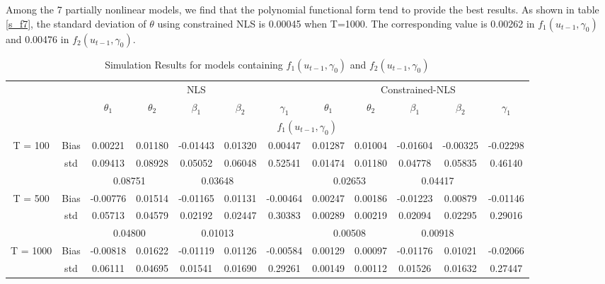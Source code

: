 \documentclass[a4paper,12pt,times,numbered,print,index]{report}
\numberwithin{equation}{section}
\begin{document}
Among the 7 partially nonlinear models, we find that the polynomial functional form tend to provide the best results. As shown in table \ref{s_f7}, the standard deviation of $\theta$ using constrained NLS is 0.00045 when T=1000. The corresponding value is 0.00262 in $f_1(u_{t-1}, \gamma_0)$ and 0.00476 in $f_2(u_{t-1}, \gamma_0)$.


\begin{table}[htbp]
  \centering
  \caption{Simulation Results for models containing $f_1 (u_{t-1}, \gamma_0)$ and $f_2 (u_{t-1}, \gamma_0)$}
    \begin{adjustbox}{max width=\textwidth}
    \begin{tabular}{cccccccccccc}
    \toprule
          &       & \multicolumn{5}{c}{NLS}               & \multicolumn{5}{c}{Constrained-NLS} \\
          &       & $\theta_1$ & $\theta_2$ & $\beta_1$ & $\beta_2$ & $\gamma_1$ & $\theta_1$ & $\theta_2$ & $\beta_1$ & $\beta_2$ & $\gamma_1$ \\
    \midrule
    &       & \multicolumn{10}{c}{$f_1 (u_{t-1}, \gamma_0)$}                \\
    \midrule
    \multirow{3}[1]{*}{T = 100} & Bias  & 0.00221 & 0.01180 & -0.01443 & 0.01320 & 0.00447 & 0.01287 & 0.01004 & -0.01604 & -0.00325 & -0.02298 \\
          & std   & 0.09413 & 0.08928 & 0.05052 & 0.06048 & 0.52541 & 0.01474 & 0.01180 & 0.04778 & 0.05835 & 0.46140 \\
          &       & \multicolumn{2}{c}{0.08751} & \multicolumn{2}{c}{0.03648} &       & \multicolumn{2}{c}{0.02653} & \multicolumn{2}{c}{0.04417} &  \\
    \multirow{3}[0]{*}{T = 500} & Bias  & -0.00776 & 0.01514 & -0.01165 & 0.01131 & -0.00464 & 0.00247 & 0.00186 & -0.01223 & 0.00879 & -0.01146 \\
          & std   & 0.05713 & 0.04579 & 0.02192 & 0.02447 & 0.30383 & 0.00289 & 0.00219 & 0.02094 & 0.02295 & 0.29016 \\
          &       & \multicolumn{2}{c}{0.04800} & \multicolumn{2}{c}{0.01013} &       & \multicolumn{2}{c}{0.00508} & \multicolumn{2}{c}{0.00918} &  \\
    \multirow{3}[1]{*}{T = 1000} & Bias  & -0.00818 & 0.01622 & -0.01119 & 0.01126 & -0.00584 & 0.00129 & 0.00097 & -0.01176 & 0.01021 & -0.02066 \\
          & std   & 0.06111 & 0.04695 & 0.01541 & 0.01690 & 0.29261 & 0.00149 & 0.00112 & 0.01526 & 0.01632 & 0.27447 \\

\end{tabular}
\end{adjustbox}
\end{table}
\end{document}
